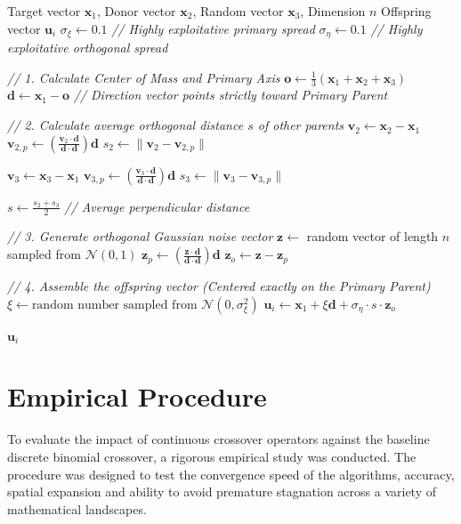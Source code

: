 \documentclass[conference]{IEEEtran}
\begin{document}
\begin{algorithm}[htbp]
\caption{Parent-Centric Crossover}
\label{alg:pcx_crossover}
\begin{algorithmic}[1] 
\REQUIRE Target vector $\mathbf{x}_1$, Donor vector $\mathbf{x}_2$, Random vector $\mathbf{x}_3$, Dimension $n$
\ENSURE Offspring vector $\mathbf{u}_i$
\STATE $\sigma_\xi \gets 0.1$ \textit{ // Highly exploitative primary spread}
\STATE $\sigma_\eta \gets 0.1$ \textit{ // Highly exploitative orthogonal spread}

\STATE \textit{// 1. Calculate Center of Mass and Primary Axis}
\STATE $\mathbf{o} \gets \frac{1}{3}(\mathbf{x}_1 + \mathbf{x}_2 + \mathbf{x}_3)$
\STATE $\mathbf{d} \gets \mathbf{x}_1 - \mathbf{o}$ \textit{ // Direction vector points strictly toward Primary Parent}

\STATE \textit{// 2. Calculate average orthogonal distance $s$ of other parents}
\STATE $\mathbf{v}_2 \gets \mathbf{x}_2 - \mathbf{x}_1$
\STATE $\mathbf{v}_{2, p} \gets \left( \frac{\mathbf{v}_2 \cdot \mathbf{d}}{\mathbf{d} \cdot \mathbf{d}} \right) \mathbf{d}$
\STATE $s_2 \gets \|\mathbf{v}_2 - \mathbf{v}_{2, p}\|$

\STATE $\mathbf{v}_3 \gets \mathbf{x}_3 - \mathbf{x}_1$
\STATE $\mathbf{v}_{3, p} \gets \left( \frac{\mathbf{v}_3 \cdot \mathbf{d}}{\mathbf{d} \cdot \mathbf{d}} \right) \mathbf{d}$
\STATE $s_3 \gets \|\mathbf{v}_3 - \mathbf{v}_{3, p}\|$

\STATE $s \gets \frac{s_2 + s_3}{2}$ \textit{ // Average perpendicular distance}

\STATE \textit{// 3. Generate orthogonal Gaussian noise vector}
\STATE $\mathbf{z} \gets$ random vector of length $n$ sampled from $\mathcal{N}(0, 1)$
\STATE $\mathbf{z}_p \gets \left( \frac{\mathbf{z} \cdot \mathbf{d}}{\mathbf{d} \cdot \mathbf{d}} \right) \mathbf{d}$
\STATE $\mathbf{z}_o \gets \mathbf{z} - \mathbf{z}_p$

\STATE \textit{// 4. Assemble the offspring vector (Centered exactly on the Primary Parent)}
\STATE $\xi \gets \text{random number sampled from } \mathcal{N}(0, \sigma_\xi^2)$
\STATE $\mathbf{u}_i \gets \mathbf{x}_1 + \xi\mathbf{d} + \sigma_\eta \cdot s \cdot \mathbf{z}_o$

\RETURN $\mathbf{u}_i$
\end{algorithmic}
\end{algorithm}

\section{Empirical Procedure}
To evaluate the impact of continuous crossover operators against the baseline discrete binomial crossover, a rigorous empirical study was conducted. 
The procedure was designed to test the convergence speed of the algorithms, 
accuracy, spatial expansion and ability to avoid premature stagnation across a variety of mathematical landscapes.
\end{document}
